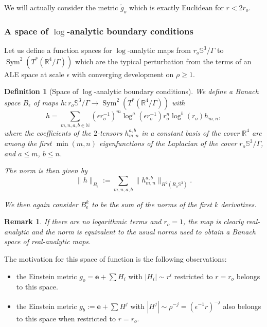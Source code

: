 \documentclass[12pt]{article}
\newtheorem{defn}[thm]{Definition}
\newtheorem{rem}[thm]{Remark}
\begin{document}
    We will actually consider the metric $\tilde{g}_o$ which is exactly Euclidean for $r<2 r_o$.
    
    
    \subsubsection{A space of $\log$-analytic boundary conditions}
    
    Let us define a function spaces for $\log$-analytic maps from $ r_o\mathbb{S}^3\slash\Gamma $ to $\operatorname{Sym}^2(T^*(\mathbb{R}^4\slash\Gamma))$ which are the typical perturbation from the terms of an ALE space at scale $\epsilon$ with converging development on $\rho \geqslant 1$.
    \begin{defn}[Space of $\log$-analytic boundary conditions]
        We define a Banach space $B_\epsilon$ of maps $h: r_o\mathbb{S}^3\slash\Gamma \to \operatorname{Sym}^2(T^*(\mathbb{R}^4\slash\Gamma))$ with 
        $$h= \sum_{m,n,a,b\in \mathbb{N}} (\epsilon r_o^{-1})^m\log^a(\epsilon r_o^{-1}) r_o^n\log^b(r_o) h_{m,n}, $$ 
        where the coefficients of the $2$-tensors $h_{m,n}^{a,b}$ in a constant basis of the cover $\mathbb{R}^4$ are among the first $\min(m,n)$ eigenfunctions of the Laplacian of the cover $r_o\mathbb{S}^3\slash\Gamma$, and $a\leqslant m$, $b\leqslant n$.
        
        The norm is then given by $$\|h\|_{B_\epsilon}:=\sum_{m,n,a,b} \|h_{m,n}^{a,b}\|_{H^2(R_o\mathbb{S}^3)}.$$
        
        We then again consider $B_\epsilon^k$ to be the sum of the norms of the first $k$ derivatives.
    \end{defn}
    
    \begin{rem}
        If there are no logarithmic terms and $r_o = 1$, the map is clearly real-analytic and the norm is equivalent to the usual norms used to obtain a Banach space of real-analytic maps. 
    \end{rem}
    
    The motivation for this space of function is the following observations:
    \begin{itemize}
        \item the Einstein metric $g_o = \mathbf{e} + \sum H_i$ with $|H_i|\sim r^i$ restricted to $r=r_o$ belongs to this space.
        \item the Einstein metric $g_b := \mathbf{e} + \sum H^j$ with $|H^{j}|\sim \rho^{-j} = (\epsilon^{-1}r)^{-j}$ also belongs to this space when restricted to $r=r_o$.
    \end{itemize}
    
\end{document}
